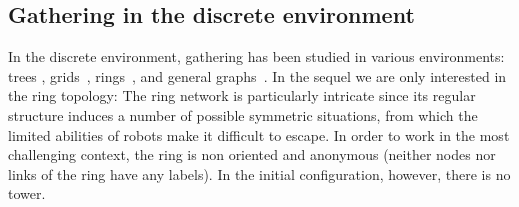 \subsection{Gathering in the discrete environment}
In the discrete environment, gathering  has been studied in various environments: trees \cite{FraigniaudP08}, grids~\cite{DAngeloSKN12}, rings~\cite{KlasingMP06,klasing_taking_2008}, and general graphs~\cite{DessmarkFKP06}. 
In the sequel we are only interested in the ring topology: The ring network is particularly intricate since its regular structure induces a number of possible symmetric situations, from which the limited abilities of robots make it difficult to escape. 
In order to work in the most challenging context, the ring is non oriented and anonymous (neither nodes nor links of the ring have any labels). In the initial configuration, however, there is no tower.

